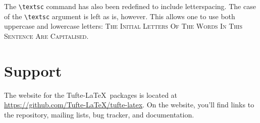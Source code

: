 \documentclass[letter]{tufte-handout} %
\begin{document}
The \texttt{\textbackslash textsc} command has also been redefined to include letterspacing. The case of the \texttt{\textbackslash textsc} argument is left as is, however. This allows one to use both uppercase and lowercase letters: \textsc{The Initial Letters Of The Words In This Sentence Are Capitalised.}


\section{Support}\label{sec:support}

The website for the Tufte-\LaTeX\ packages is located at \url{https://github.com/Tufte-LaTeX/tufte-latex}. On the website, you'll find links to the  repository, mailing lists, bug tracker, and documentation.





\end{document}
